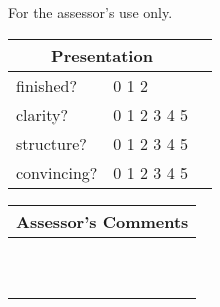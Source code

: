 \documentclass[a4paper,10pt]{article}
\begin{document}
\vspace{4mm}
\hspace*{-10mm}
\small For the assessor's use only.

\hspace*{-10mm}
\begin{tabular}{|l|l|l|}
\hline
 \multicolumn{2}{|c|}{Presentation} \\ \hline
 finished?      & 0  1  2 \\ \hline
 clarity?       & 0  1  2  3  4  5\\ \hline
 structure?     & 0  1  2  3  4  5\\ \hline
 convincing?    & 0  1  2  3  4  5\\ \hline
\end{tabular}
\hspace*{3mm}
\begin{tabular}{|l|}
\hline
\hspace*{35mm} Assessor's Comments\hspace*{50mm} \\ \hline
\\
\\
\\
\\
\\
\\
\\
\\
\\
\\ \hline
\end{tabular}
\end{document}
